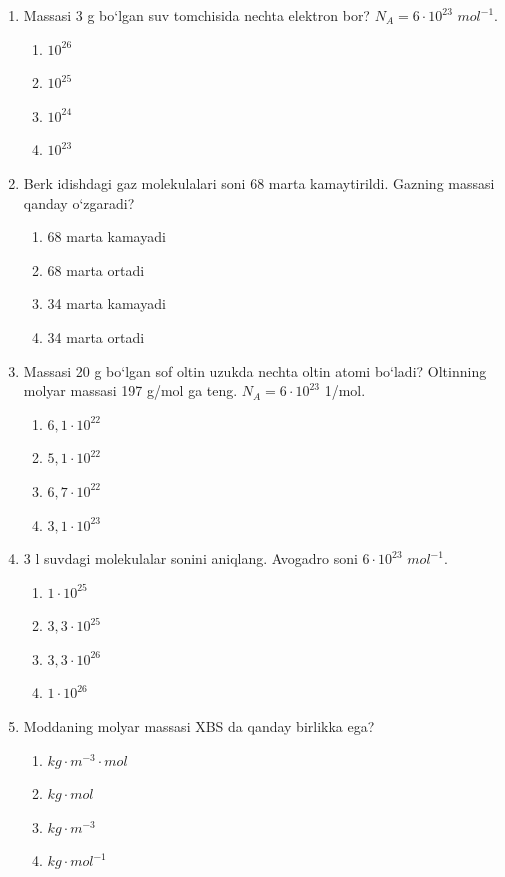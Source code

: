 \begin{enumerate}
\item Massasi 3 g bo‘lgan suv tomchisida nechta elektron bor? $N_A = 6 \cdot 10^{23}$ $mol^{-1}$.
\begin{enumerate}[label=\Alph*)]
\item $10^{26}$
\item $10^{25}$
\item $10^{24}$
\item $10^{23}$
\end{enumerate}

\item Berk idishdagi gaz molekulalari soni 68 marta kamaytirildi. Gazning massasi qanday o‘zgaradi?
\begin{enumerate}[label=\Alph*)]
\item 68 marta kamayadi
\item 68 marta ortadi
\item 34 marta kamayadi
\item 34 marta ortadi
\end{enumerate}

\item Massasi 20 g bo‘lgan sof oltin uzukda nechta oltin atomi bo‘ladi? Oltinning molyar massasi 197 g/mol ga teng. $N_A = 6 \cdot 10^{23}$ 1/mol.
\begin{enumerate}[label=\Alph*)]
\item $6,1 \cdot 10^{22}$
\item $5,1 \cdot 10^{22}$
\item $6,7 \cdot 10^{22}$
\item $3,1 \cdot 10^{23}$
\end{enumerate}

\item 3 l suvdagi molekulalar sonini aniqlang. Avogadro soni $6 \cdot 10^{23}$ $mol^{-1}$.
\begin{enumerate}[label=\Alph*)]
\item $1 \cdot 10^{25}$
\item $3,3 \cdot 10^{25}$
\item $3,3 \cdot 10^{26}$
\item $1 \cdot 10^{26}$
\end{enumerate}

\item Moddaning molyar massasi XBS da qanday birlikka ega?
\begin{enumerate}[label=\Alph*)]
\item $kg \cdot m^{-3} \cdot mol$
\item $kg \cdot mol$
\item $kg \cdot m^{-3}$
\item $kg \cdot mol^{-1}$
\end{enumerate}


\end{enumerate}
